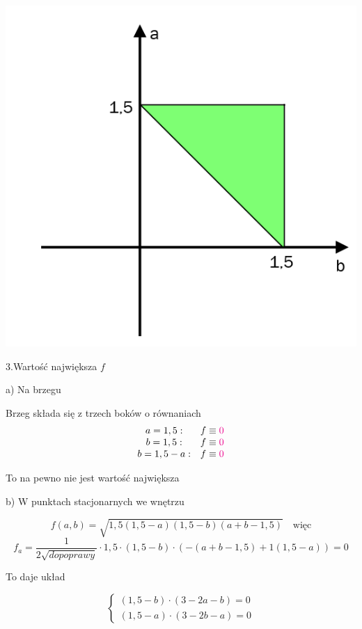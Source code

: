 \begin{przykladbig}
\begin{center}
    \includegraphics[scale=0.5]{img/trojkat.png}
\end{center}
\bigskip

3.Wartość największa $f$ \bigskip

a) Na brzegu

Brzeg składa się z trzech boków o równaniach
\[ \begin{array}{cc}
    a = 1,5: & f \equiv \textcolor{magenta}{0} \\
    b = 1,5: & f \equiv \textcolor{magenta}{0} \\
    b = 1,5 - a: & f \equiv \textcolor{magenta}{0} \\
\end{array}
\]

To na pewno nie jest wartość największa \bigskip

b) W punktach stacjonarnych we wnętrzu

\[ f(a,b) = \sqrt{1,5(1,5-a)(1,5-b)(a+b-1,5)} \quad \textrm{więc} \]
\[ f_a = \frac{1}{2\sqrt{do poprawy}} \cdot 1,5 \cdot (1,5 - b) \cdot (-(a+b - 1,5) + 1(1,5 - a)) = 0 \]

To daje układ

\[ \begin{cases} (1,5 - b) \cdot (3 - 2a - b) = 0 \\ (1,5 - a) \cdot (3 - 2b - a) = 0 \end{cases} \]


\end{przykladbig}
